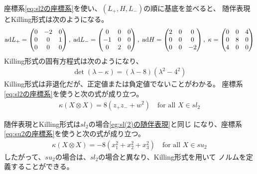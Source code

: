 {	\begin{example}[sl(2)]\label{eg:sl(2)の随伴表現} %
		座標系\eqref{eq:sl2の座標系}を使い、$(L_+,H,L_-)$の順に基底を並べると、
		随伴表現とKilling形式は次のようになる。
		\begin{equation*}\begin{split}
			{\ensuremath{\operatorname{ad}}} L_+ = \begin{pmatrix}
				0 & -2 & 0 \\ 0 & 0 & 1 \\ 0 & 0 & 0
			\end{pmatrix},\; {\operatorname{ad}} L_- = \begin{pmatrix}
				0 & 0 & 0 \\ -1 & 0 & 0 \\ 0 & 2 & 0
			\end{pmatrix},\; {\operatorname{ad}} H = \begin{pmatrix}
				2 & 0 & 0 \\ 0 & 0 & 0 \\ 0 & 0 & -2
			\end{pmatrix},\; \kappa = \begin{pmatrix}
				0 & 0 & 4 \\ 0 & 8 & 0 \\ 4 & 0 & 0
			\end{pmatrix}
		\end{split}\end{equation*}
		Killing形式の固有方程式は次のようになり、
		\begin{equation*}\begin{split}
			\det(\lambda - \kappa) = (\lambda - 8)(\lambda^2 - 4^2)
		\end{split}\end{equation*}
		Killing形式は非退化だが、正定値または負定値でないことがわかる。
		座標系\eqref{eq:sl2の座標系}を使うと次の式が成り立つ。
		\begin{equation*}\begin{split}
			\kappa(X\otimes X) = 8(z_+z_-+w^2) \quad\text{for all } X\in sl_2
		\end{split}\end{equation*}
	\end{example} %

	\begin{example}[su(2)]\label{eg:su(2)の随伴表現} %
		随伴表現とKilling形式は$sl_2$の場合\ref{eg:sl(2)の随伴表現}と同じ
		になり、座標系\eqref{eq:su2の座標系}を使うと次の式が成り立つ。
		\begin{equation*}\begin{split}
			\kappa(X\otimes X) = -8\left(x_1^2+x_2^2+x_3^2\right)
			\quad\text{for all } X\in su_2
		\end{split}\end{equation*}
		したがって、$su_2$の場合は、$sl_2$の場合と異なり、Killing形式を用いて
		ノルムを定義することができる。
	\end{example} %

}
